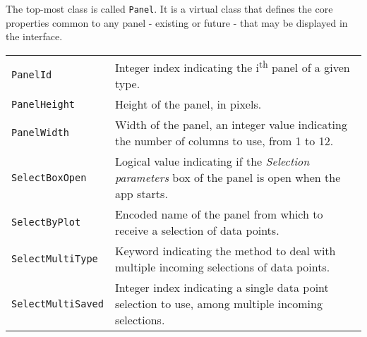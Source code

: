 \documentclass[]{book}
\begin{document}
The top-most class is called \texttt{Panel}.
It is a virtual class that defines the core properties common to any panel - existing or future - that may be displayed in the interface.

\begin{longtable}[]{@{}ll@{}}
\toprule
\endhead
\begin{minipage}[t]{0.47\columnwidth}\raggedright
\texttt{PanelId}\strut
\end{minipage} & \begin{minipage}[t]{0.47\columnwidth}\raggedright
Integer index indicating the i\textsuperscript{th} panel of a given type.\strut
\end{minipage}\tabularnewline
\begin{minipage}[t]{0.47\columnwidth}\raggedright
\texttt{PanelHeight}\strut
\end{minipage} & \begin{minipage}[t]{0.47\columnwidth}\raggedright
Height of the panel, in pixels.\strut
\end{minipage}\tabularnewline
\begin{minipage}[t]{0.47\columnwidth}\raggedright
\texttt{PanelWidth}\strut
\end{minipage} & \begin{minipage}[t]{0.47\columnwidth}\raggedright
Width of the panel, an integer value indicating the number of columns to use, from 1 to 12.\strut
\end{minipage}\tabularnewline
\begin{minipage}[t]{0.47\columnwidth}\raggedright
\texttt{SelectBoxOpen}\strut
\end{minipage} & \begin{minipage}[t]{0.47\columnwidth}\raggedright
Logical value indicating if the \emph{Selection parameters} box of the panel is open when the app starts.\strut
\end{minipage}\tabularnewline
\begin{minipage}[t]{0.47\columnwidth}\raggedright
\texttt{SelectByPlot}\strut
\end{minipage} & \begin{minipage}[t]{0.47\columnwidth}\raggedright
Encoded name of the panel from which to receive a selection of data points.\strut
\end{minipage}\tabularnewline
\begin{minipage}[t]{0.47\columnwidth}\raggedright
\texttt{SelectMultiType}\strut
\end{minipage} & \begin{minipage}[t]{0.47\columnwidth}\raggedright
Keyword indicating the method to deal with multiple incoming selections of data points.\strut
\end{minipage}\tabularnewline
\begin{minipage}[t]{0.47\columnwidth}\raggedright
\texttt{SelectMultiSaved}\strut
\end{minipage} & \begin{minipage}[t]{0.47\columnwidth}\raggedright
Integer index indicating a single data point selection to use, among multiple incoming selections.\strut
\end{minipage}\tabularnewline
\bottomrule
\end{longtable}
\end{document}
